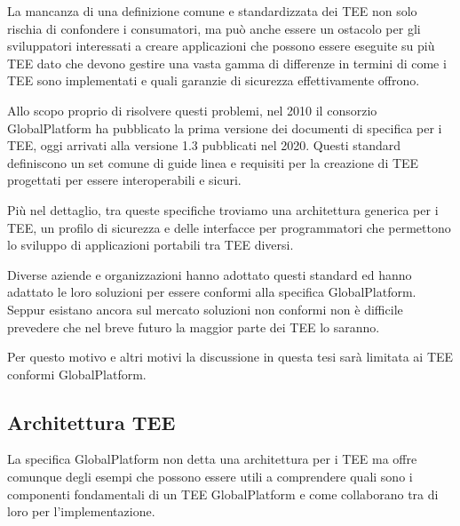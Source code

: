 \documentclass[12pt,italian]{report}
\begin{document}
La mancanza di una definizione comune e standardizzata dei TEE non solo rischia
di confondere i consumatori, ma può anche essere un ostacolo per gli sviluppatori
interessati a creare applicazioni che possono essere eseguite su più TEE
dato che devono gestire una vasta gamma di differenze in termini di come i
TEE sono implementati e quali garanzie di sicurezza effettivamente offrono.

Allo scopo proprio di risolvere questi problemi, nel 2010 il consorzio
GlobalPlatform ha pubblicato la prima versione dei documenti di specifica
per i TEE, oggi arrivati alla versione 1.3 pubblicati nel 2020.
Questi standard definiscono un set comune di guide linea e requisiti per la
creazione di TEE progettati per essere interoperabili e sicuri.

Più nel dettaglio, tra queste specifiche troviamo una architettura
generica per i TEE, un profilo di sicurezza e delle interfacce per
programmatori che permettono lo sviluppo di applicazioni portabili tra TEE
diversi. 

Diverse aziende e organizzazioni hanno adottato questi standard
ed hanno adattato le loro soluzioni per essere conformi alla specifica
GlobalPlatform.
Seppur esistano ancora sul mercato soluzioni non conformi non è difficile
prevedere che nel breve futuro la maggior parte dei TEE lo saranno.

Per questo motivo e altri motivi la discussione in questa tesi sarà limitata
ai TEE conformi GlobalPlatform.

\subsection{Architettura TEE}
\label{subsec:architettura-tee}

La specifica GlobalPlatform non detta una architettura per i TEE ma offre
comunque degli esempi che possono essere utili a comprendere quali sono
i componenti fondamentali di un TEE GlobalPlatform e come collaborano
tra di loro per l'implementazione.
\end{document}
